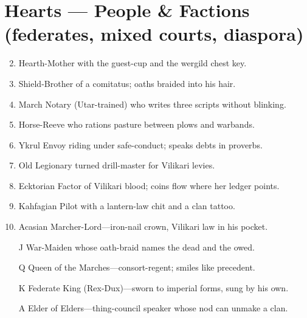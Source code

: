 \section*{Hearts --- People \& Factions (federates, mixed courts, diaspora)}
\label{sec:vilikari-people}
\begin{enumerate}
\setcounter{enumi}{1}
\item Hearth-Mother with the guest-cup and the wergild chest key.
\item Shield-Brother of a comitatus; oaths braided into his hair.
\item March Notary (Utar-trained) who writes three scripts without blinking.
\item Horse-Reeve who rations pasture between plows and warbands.
\item Ykrul Envoy riding under safe-conduct; speaks debts in proverbs.
\item Old Legionary turned drill-master for Vilikari levies.
\item Ecktorian Factor of Vilikari blood; coins flow where her ledger points.
\item Kahfagian Pilot with a lantern-law chit and a clan tattoo.
\item Acasian Marcher-Lord---iron-nail crown, Vilikari law in his pocket.
\item[J] War-Maiden whose oath-braid names the dead and the owed.
\item[Q] Queen of the Marches---consort-regent; smiles like precedent.
\item[K] Federate King (Rex-Dux)---sworn to imperial forms, sung by his own.
\item[A] Elder of Elders---thing-council speaker whose nod can unmake a clan.
\end{enumerate}

